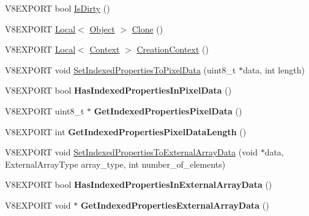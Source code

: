 \begin{DoxyCompactItemize}
\item 
V8\+E\+X\+P\+O\+R\+T bool \hyperlink{classv8_1_1_object_a76d0c5021dd74a57239ad64d1cb1c83c}{Is\+Dirty} ()
\item 
V8\+E\+X\+P\+O\+R\+T \hyperlink{classv8_1_1_local}{Local}$<$ \hyperlink{classv8_1_1_object}{Object} $>$ \hyperlink{classv8_1_1_object_a45a67c1b0408922403048b59a5bc22b2}{Clone} ()
\item 
V8\+E\+X\+P\+O\+R\+T \hyperlink{classv8_1_1_local}{Local}$<$ \hyperlink{classv8_1_1_context}{Context} $>$ \hyperlink{classv8_1_1_object_a509f00335e1e0ddfc4bcf93d9e1cb567}{Creation\+Context} ()
\item 
V8\+E\+X\+P\+O\+R\+T void \hyperlink{classv8_1_1_object_a3f08aee708af5e2856e65e81b22edc61}{Set\+Indexed\+Properties\+To\+Pixel\+Data} (uint8\+\_\+t $\ast$data, int length)
\item 
\hypertarget{classv8_1_1_object_a559c5db719c43a40b5f615a0c955dbaa}{}V8\+E\+X\+P\+O\+R\+T bool {\bfseries Has\+Indexed\+Properties\+In\+Pixel\+Data} ()\label{classv8_1_1_object_a559c5db719c43a40b5f615a0c955dbaa}

\item 
\hypertarget{classv8_1_1_object_af9f801a1165992961f902fbee25fbe87}{}V8\+E\+X\+P\+O\+R\+T uint8\+\_\+t $\ast$ {\bfseries Get\+Indexed\+Properties\+Pixel\+Data} ()\label{classv8_1_1_object_af9f801a1165992961f902fbee25fbe87}

\item 
\hypertarget{classv8_1_1_object_a39892346c98e665c02b410ebdf58a7b0}{}V8\+E\+X\+P\+O\+R\+T int {\bfseries Get\+Indexed\+Properties\+Pixel\+Data\+Length} ()\label{classv8_1_1_object_a39892346c98e665c02b410ebdf58a7b0}

\item 
V8\+E\+X\+P\+O\+R\+T void \hyperlink{classv8_1_1_object_a53be627cd653a5591038a4d81a908f64}{Set\+Indexed\+Properties\+To\+External\+Array\+Data} (void $\ast$data, External\+Array\+Type array\+\_\+type, int number\+\_\+of\+\_\+elements)
\item 
\hypertarget{classv8_1_1_object_a92c4c4b66d3dd30d77bdea30a20ec4f7}{}V8\+E\+X\+P\+O\+R\+T bool {\bfseries Has\+Indexed\+Properties\+In\+External\+Array\+Data} ()\label{classv8_1_1_object_a92c4c4b66d3dd30d77bdea30a20ec4f7}

\item 
\hypertarget{classv8_1_1_object_a4ac77257bc3f809d4abc76f176909747}{}V8\+E\+X\+P\+O\+R\+T void $\ast$ {\bfseries Get\+Indexed\+Properties\+External\+Array\+Data} ()\label{classv8_1_1_object_a4ac77257bc3f809d4abc76f176909747}


\end{DoxyCompactItemize}
